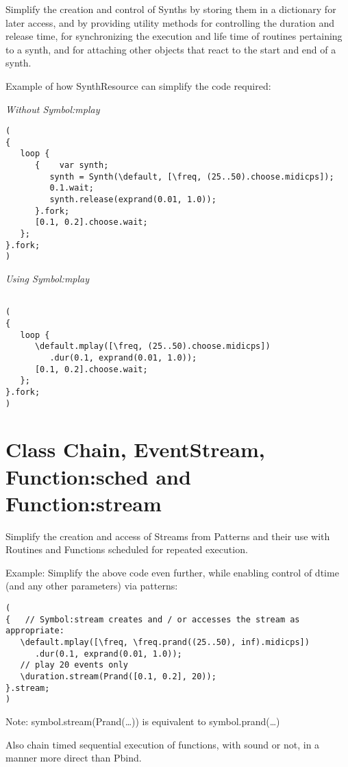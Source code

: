 \documentclass[11pt]{article}
\begin{document}
Simplify the creation and control of Synths by storing them in a dictionary for later access, and by providing utility methods for
controlling the duration and release time, for synchronizing the execution and life time of routines pertaining to a synth, and for attaching other objects that react to the start and end of a synth.

Example of how SynthResource can simplify the code required: 

\emph{Without Symbol:mplay}

\begin{verbatim}
(
{
   loop {
      {    var synth;
         synth = Synth(\default, [\freq, (25..50).choose.midicps]);
         0.1.wait;
         synth.release(exprand(0.01, 1.0));
      }.fork;
      [0.1, 0.2].choose.wait;
   };
}.fork;
)
\end{verbatim}

\emph{Using Symbol:mplay}

\begin{verbatim}

(
{
   loop {
      \default.mplay([\freq, (25..50).choose.midicps])
         .dur(0.1, exprand(0.01, 1.0));
      [0.1, 0.2].choose.wait;
   };
}.fork;
)
\end{verbatim}
\section{Class Chain, EventStream, Function:sched and Function:stream}
\label{sec-3}


Simplify the creation and access of Streams from Patterns and their use with Routines and Functions scheduled for repeated execution.  

Example: Simplify the above code even further, while enabling  control of dtime (and any other parameters) via patterns:

\begin{verbatim}
(
{   // Symbol:stream creates and / or accesses the stream as appropriate: 
   \default.mplay([\freq, \freq.prand((25..50), inf).midicps])
      .dur(0.1, exprand(0.01, 1.0));
   // play 20 events only
   \duration.stream(Prand([0.1, 0.2], 20)); 
}.stream;    
)
\end{verbatim}

Note: symbol.stream(Prand(\ldots{})) is equivalent to symbol.prand(\ldots{})

Also chain timed sequential execution of functions, with sound or not, in a manner more direct than Pbind.
\end{document}
